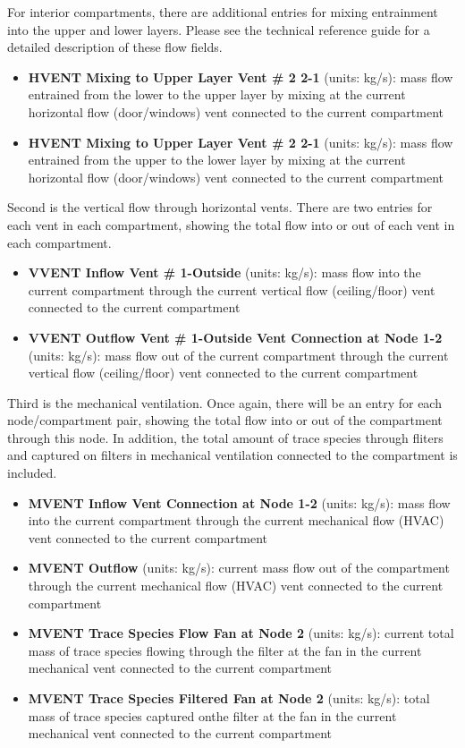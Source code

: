  For interior compartments, there are additional entries for mixing entrainment into the upper and lower layers. Please see the technical reference guide for a detailed description of these flow fields.

\begin{itemize}
\item \textbf{HVENT Mixing to Upper Layer Vent \# 2 2-1} (units: kg/s): mass flow entrained from the lower to the upper layer by mixing at the current horizontal flow (door/windows) vent connected to the current compartment
\item \textbf{HVENT Mixing to Upper Layer Vent \# 2 2-1} (units: kg/s): mass flow entrained from the upper to the lower layer by mixing at the current horizontal flow (door/windows) vent connected to the current compartment
\end{itemize}

Second is the vertical flow through horizontal vents. There are two entries for each vent in each compartment, showing the total flow into or out of each vent in each compartment.

\begin{itemize}
\item \textbf{VVENT Inflow Vent \# 1-Outside} (units: kg/s):  mass flow into the current compartment through the current vertical flow (ceiling/floor) vent connected to the current compartment
\item \textbf{VVENT Outflow Vent \# 1-Outside Vent Connection at Node 1-2} (units: kg/s):  mass flow out of the current  compartment through the current vertical flow (ceiling/floor) vent connected to the current compartment
\end{itemize}

Third is the mechanical ventilation. Once again, there will be an entry for each node/compartment pair, showing the total flow into or out of the compartment through this node. In addition, the total amount of trace species through fliters and captured on filters in mechanical ventilation connected to the compartment is included.

\begin{itemize}
\item \textbf{MVENT Inflow Vent Connection at Node 1-2} (units: kg/s): mass flow into the current compartment through the current mechanical flow (HVAC) vent connected to the current compartment
\item \textbf{MVENT Outflow} (units: kg/s): current mass flow out of the compartment through the current mechanical flow (HVAC) vent connected to the current compartment
\item \textbf{MVENT Trace Species Flow Fan at Node 2} (units: kg/s): current total mass of trace species flowing through the filter at the fan in the current mechanical vent connected to the current compartment
\item \textbf{MVENT Trace Species Filtered Fan at Node 2} (units: kg/s): total mass of trace species captured onthe filter at the fan in the current mechanical vent connected to the current compartment
\end{itemize}

